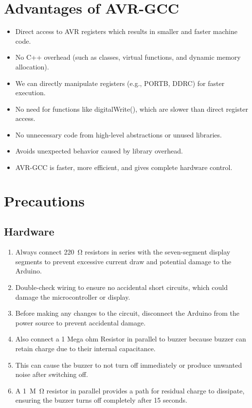 \documentclass[journal]{IEEEtran}
\begin{document}
\section{Advantages of AVR-GCC}
\begin{itemize}
    \item Direct access to AVR registers which results in smaller and faster machine code.
    \item No C++ overhead (such as classes, virtual functions, and dynamic memory allocation).
    \item We can directly manipulate registers (e.g., PORTB, DDRC) for faster execution.
    \item No need for functions like digitalWrite(), which are slower than direct register access.
    \item No unnecessary code from high-level abstractions or unused libraries.
    \item Avoids unexpected behavior caused by library overhead.
    \item AVR-GCC is faster, more efficient, and gives complete hardware control. 
\end{itemize}

\section{Precautions}
\subsection{Hardware}
\begin{enumerate}
    \item  Always connect \SI{220}{\ohm} resistors in series with the seven-segment display segments to prevent excessive current draw and potential damage to the Arduino.
    \item  Double-check wiring to ensure no accidental short circuits, which could damage the microcontroller or display.
    \item  Before making any changes to the circuit, disconnect the Arduino from the power source to prevent accidental damage.
    \item Also connect a 1 Mega ohm Resistor in parallel to buzzer because buzzer can retain charge due to their internal capacitance.
    \item This can cause the buzzer to not turn off immediately or produce unwanted noise after switching off.
    \item A \SI{1}{M\ohm} resistor in parallel provides a path for residual charge to dissipate, ensuring the buzzer turns off completely after 15 seconds.
\end{enumerate}
\end{document}
